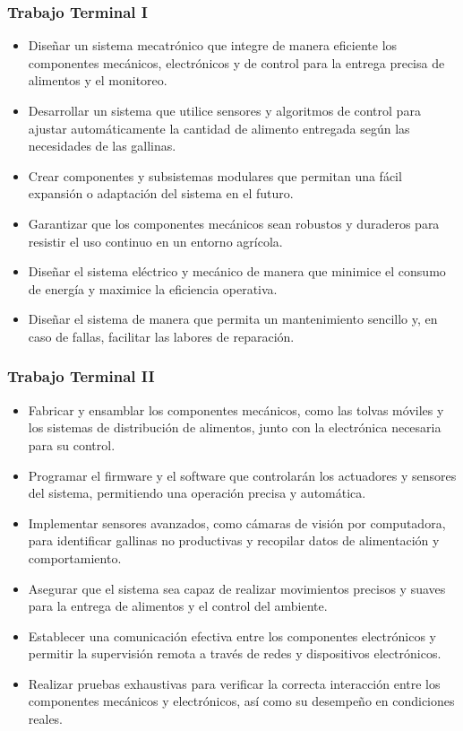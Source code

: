 \subsubsection{Trabajo Terminal I}

\begin{itemize}
    \item Diseñar un sistema mecatrónico que integre de manera eficiente los componentes mecánicos, electrónicos y de control para la entrega precisa de alimentos y el monitoreo.
    \item Desarrollar un sistema que utilice sensores y algoritmos de control para ajustar automáticamente la cantidad de alimento entregada según las necesidades de las gallinas.
    \item Crear componentes y subsistemas modulares que permitan una fácil expansión o adaptación del sistema en el futuro.
    \item Garantizar que los componentes mecánicos sean robustos y duraderos para resistir el uso continuo en un entorno agrícola.
    \item Diseñar el sistema eléctrico y mecánico de manera que minimice el consumo de energía y maximice la eficiencia operativa.
    \item Diseñar el sistema de manera que permita un mantenimiento sencillo y, en caso de fallas, facilitar las labores de reparación.

  \end{itemize}

\subsubsection{Trabajo Terminal II}

\begin{itemize}
    \item Fabricar y ensamblar los componentes mecánicos, como las tolvas móviles y los sistemas de distribución de alimentos, junto con la electrónica necesaria para su control.
    \item Programar el firmware y el software que controlarán los actuadores y sensores del sistema, permitiendo una operación precisa y automática.
    \item Implementar sensores avanzados, como cámaras de visión por computadora, para identificar gallinas no productivas y recopilar datos de alimentación y comportamiento.
    \item Asegurar que el sistema sea capaz de realizar movimientos precisos y suaves para la entrega de alimentos y el control del ambiente.
    \item Establecer una comunicación efectiva entre los componentes electrónicos y permitir la supervisión remota a través de redes y dispositivos electrónicos.
    \item Realizar pruebas exhaustivas para verificar la correcta interacción entre los componentes mecánicos y electrónicos, así como su desempeño en condiciones reales.
\end{itemize}

